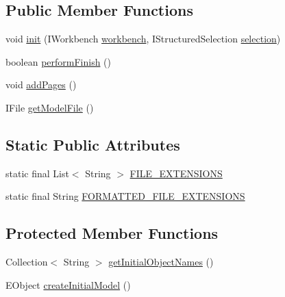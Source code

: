 \subsection*{Public Member Functions}
\begin{DoxyCompactItemize}
\item 
void \hyperlink{classshootingmachineemfmodel_1_1presentation_1_1_shootingmachineemfmodel_model_wizard_afdcda7c3c39b7befa0fc7400ed314b32}{init} (I\-Workbench \hyperlink{classshootingmachineemfmodel_1_1presentation_1_1_shootingmachineemfmodel_model_wizard_a5170c9853972c24bd2ee4d11ad384fde}{workbench}, I\-Structured\-Selection \hyperlink{classshootingmachineemfmodel_1_1presentation_1_1_shootingmachineemfmodel_model_wizard_aad927182a7d8d6009308666dfa170cb6}{selection})
\item 
boolean \hyperlink{classshootingmachineemfmodel_1_1presentation_1_1_shootingmachineemfmodel_model_wizard_aca9295901dc43425ab36dd99fb2a1eae}{perform\-Finish} ()
\item 
void \hyperlink{classshootingmachineemfmodel_1_1presentation_1_1_shootingmachineemfmodel_model_wizard_af500dbf151ba25ab71a0e72abc798f1d}{add\-Pages} ()
\item 
I\-File \hyperlink{classshootingmachineemfmodel_1_1presentation_1_1_shootingmachineemfmodel_model_wizard_af3a6f096a34f323f189ca69c5f360c30}{get\-Model\-File} ()
\end{DoxyCompactItemize}
\subsection*{Static Public Attributes}
\begin{DoxyCompactItemize}
\item 
static final List$<$ String $>$ \hyperlink{classshootingmachineemfmodel_1_1presentation_1_1_shootingmachineemfmodel_model_wizard_a21fe15dc665780770de69c92b64c791e}{F\-I\-L\-E\-\_\-\-E\-X\-T\-E\-N\-S\-I\-O\-N\-S}
\item 
static final String \hyperlink{classshootingmachineemfmodel_1_1presentation_1_1_shootingmachineemfmodel_model_wizard_acb643f573820d5b9e7d7594ada3562cd}{F\-O\-R\-M\-A\-T\-T\-E\-D\-\_\-\-F\-I\-L\-E\-\_\-\-E\-X\-T\-E\-N\-S\-I\-O\-N\-S}
\end{DoxyCompactItemize}
\subsection*{Protected Member Functions}
\begin{DoxyCompactItemize}
\item 
Collection$<$ String $>$ \hyperlink{classshootingmachineemfmodel_1_1presentation_1_1_shootingmachineemfmodel_model_wizard_a994a88c3f8ade021c740234d1782bf85}{get\-Initial\-Object\-Names} ()
\item 
E\-Object \hyperlink{classshootingmachineemfmodel_1_1presentation_1_1_shootingmachineemfmodel_model_wizard_a03f7d107fd2366adde499b470733c774}{create\-Initial\-Model} ()
\end{DoxyCompactItemize}

